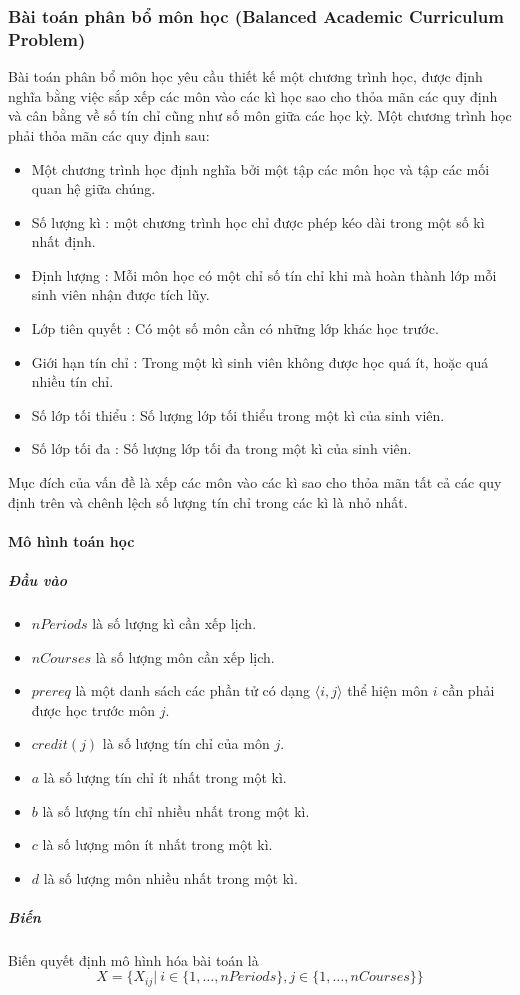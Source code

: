 \documentclass[a4paper,12pt]{report}
\begin{document}
\subsubsection{Bài toán phân bổ môn học (Balanced Academic Curriculum Problem) }
Bài toán phân bổ môn học \cite{csplib30} yêu cầu thiết kế một chương trình học, được định nghĩa bằng việc sắp xếp các môn vào các kì học sao cho thỏa mãn các quy định và cân bằng về số tín chỉ cũng như số môn giữa các học kỳ. Một chương trình học phải thỏa mãn các quy định sau:
\begin{itemize}
\item Một chương trình học định nghĩa bởi một tập các môn học và tập các mối quan hệ giữa chúng.
\item Số lượng kì : một chương trình học chỉ được phép kéo dài trong một số kì nhất định.
\item Định lượng : Mỗi môn học có một chỉ số tín chỉ khi mà hoàn thành lớp mỗi sinh viên nhận được tích lũy.
\item Lớp tiên quyết : Có một số môn cần có những lớp khác học trước.
\item Giới hạn tín chỉ : Trong một kì sinh viên không được học quá ít, hoặc quá nhiều tín chỉ.
\item Số lớp tối thiểu : Số lượng lớp tối thiểu trong một kì của sinh viên.
\item Số lớp tối đa : Số lượng lớp tối đa trong một kì của sinh viên.
\end{itemize}
Mục đích của vấn đề là xếp các môn vào các kì sao cho thỏa mãn tất cả các quy định trên và  chênh lệch số lượng tín chỉ trong các kì là nhỏ nhất.\paragraph{Mô hình toán học}
\subparagraph{Đầu vào}
\begin{itemize}
	\item $nPeriods$ là số lượng kì cần xếp lịch.
	\item $nCourses$  là số lượng môn cần xếp lịch.
	\item $prereq$ là một danh sách các phần tử có dạng $\langle i,j \rangle $ thể hiện môn $i$ cần phải được học trước môn $j$.
	\item $credit(j)$ là số lượng tín chỉ của môn $j$.
	\item $a$ là số lượng tín chỉ ít nhất trong một kì.
	\item $b$ là số lượng tín chỉ nhiều nhất trong một kì.
	\item $c$ là số lượng môn ít nhất trong một kì.
	\item $d$ là số lượng môn nhiều nhất trong một kì.
\end{itemize}
\subparagraph{Biến}
Biến quyết định mô hình hóa bài toán là $$X= \{ X_{ij}| \ i\in \{1,\dots,nPeriods\},j\in \{1,\dots,nCourses\}  \} $$
\end{document}
